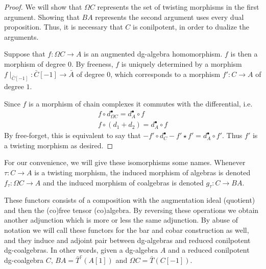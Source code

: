 \documentclass[../thesis.tex]{subfiles}
\begin{document}
            \begin{proof}
                We will show that $\Omega C$ represents the set of twisting morphisms in the first argument. Showing that $BA$ represents the second argument uses every dual proposition. Thus, it is necessary that $C$ is conilpotent, in order to dualize the arguments.

                Suppose that $f:\Omega C \rightarrow A$ is an augmented dg-algebra homomorphism. $f$ is then a morphism of degree $0$. By freeness, $f$ is uniquely determined by a morphism $f\mid_{\bar{C}[-1]}:\bar{C}[-1]\rightarrow \bar{A}$ of degree $0$, which corresponds to a morphism $f':C\rightarrow A$ of degree $1$. 

                Since $f$ is a morphism of chain complexes it commutes with the differential, i.e. 
                \begin{align*}
                    f\circ d_{\Omega C}^\bullet = d_A^\bullet\circ f \\
                    f\circ (d_1 + d_2) = d_A^\bullet\circ f 
                \end{align*}
                By free-forget, this is equivalent to say that $-f'\circ d_C^\bullet - f'\star f' = d_A^\bullet\circ f'$. Thus $f'$ is a twisting morphism as desired.
            \end{proof}

            For our convenience, we will give these isomorphisms some names. Whenever $\tau : C \rightarrow A$ is a twisting morphism, the induced morphism of algebras is denoted $f_\tau : \Omega C \rightarrow A$ and the induced morphism of coalgebras is denoted $g_\tau : C \rightarrow BA$.

            \begin{remark}
                These functors consists of a composition with the augmentation ideal (quotient) and then the (co)free tensor (co)algebra. By reversing these operations we obtain another adjunction which is more or less the same adjunction. By abuse of notation we will call these functors for the bar and cobar construction as well, and they induce and adjoint pair between dg-algebras and reduced conilpotent dg-coalgebras. In other words, given a dg-algebra $A$ and a reduced conilpotent dg-coalgebra $C$, $BA = \bar{T}^c(A[1])$ and $\Omega C = \bar{T}(C[-1])$.
                \begin{center}
                \end{center}
            \end{remark}
\end{document}
